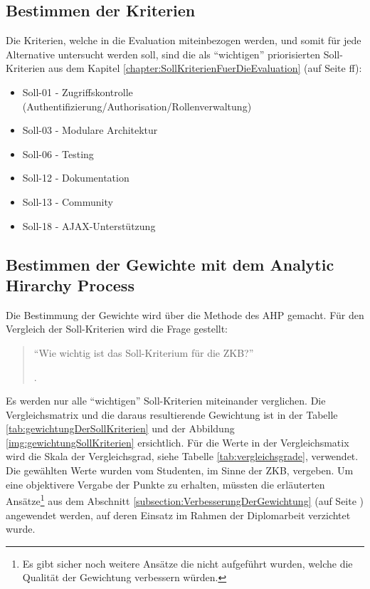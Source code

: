   \subsection{Bestimmen der Kriterien}
  
  Die Kriterien, welche in die Evaluation miteinbezogen werden, und somit für
  jede Alternative untersucht werden soll, sind die als ``wichtigen''
  priorisierten Soll-Kriterien aus dem Kapitel
  \ref{chapter:SollKriterienFuerDieEvaluation}
   (auf Seite
  \pageref{chapter:SollKriterienFuerDieEvaluation}ff):
  
  \begin{itemize}
    \item Soll-01 - Zugriffskontrolle 
    (Authentifizierung/Authorisation/Rollenverwaltung)
    \item Soll-03 - Modulare Architektur
    \item Soll-06 - Testing
    \item Soll-12 - Dokumentation
    \item Soll-13 - Community
    \item Soll-18 - AJAX-Unterstützung
  \end{itemize}
  
  \subsection{Bestimmen der Gewichte mit dem Analytic Hirarchy Process}
  
  Die Bestimmung der Gewichte wird über die Methode des \ac{AHP} gemacht. Für
  den Vergleich der Soll-Kriterien wird die Frage gestellt:
  
  \begin{quote}
  \begin{itshape}``Wie wichtig ist das Soll-Kriterium für die
  \ac{ZKB}?''\end{itshape}.
  \end{quote}
  
  Es werden nur alle ``wichtigen'' Soll-Kriterien miteinander verglichen. Die
  Vergleichsmatrix und die daraus resultierende Gewichtung ist in der Tabelle
  \ref{tab:gewichtungDerSollKriterien} und der Abbildung
  \ref{img:gewichtungSollKriterien} ersichtlich. Für die Werte in der
  Vergleichsmatix wird die Skala der Vergleichsgrad, siehe Tabelle
  \ref{tab:vergleichsgrade}, verwendet. Die gewählten Werte wurden vom
  Studenten, im Sinne der \ac{ZKB}, vergeben. Um eine objektivere Vergabe der
  Punkte zu erhalten, müssten die erläuterten Ansätze\footnote{Es gibt sicher
  noch weitere Ansätze die nicht aufgeführt wurden, welche die Qualität der
  Gewichtung verbessern würden.} aus dem Abschnitt
  \ref{subsection:VerbesserungDerGewichtung}
   (auf Seite
  \pageref{subsection:VerbesserungDerGewichtung}) angewendet werden, auf deren
  Einsatz im Rahmen der Diplomarbeit verzichtet wurde.
  
